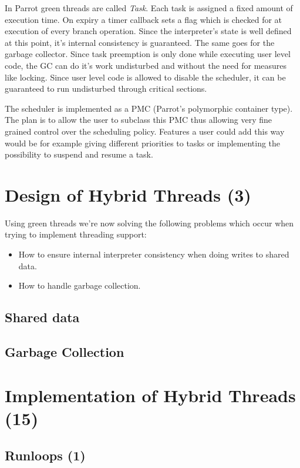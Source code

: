 \documentclass[bachelor,english]{hgbthesis}
\begin{document}
In Parrot green threads are called \textit{Task}. Each task is assigned a fixed amount of execution time. On expiry a timer callback sets a flag which is checked for at execution of every branch operation. Since the interpreter's state is well defined at this point, it's internal consistency is guaranteed. The same goes for the garbage collector. Since task preemption is only done while executing user level code, the GC can do it's work undisturbed and without the need for measures like locking. Since user level code is allowed to disable the scheduler, it can be guaranteed to run undisturbed through critical sections.

The scheduler is implemented as a PMC (Parrot's polymorphic container type). The plan is to allow the user to subclass this PMC thus allowing very fine grained control over the scheduling policy. Features a user could add this way would be for example giving different priorities to tasks or implementing the possibility to suspend and resume a task.

\chapter{Design of Hybrid Threads (3)}

Using green threads we're now solving the following problems which occur when trying to implement threading support:
%
\begin{itemize}
\item How to ensure internal interpreter consistency when doing writes to shared data.
\item How to handle garbage collection.
\end{itemize}

\section{Shared data}


\section{Garbage Collection}

\chapter{Implementation of Hybrid Threads (15)}

\section{Runloops (1)}
\end{document}
